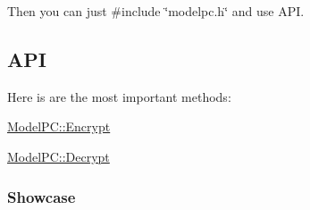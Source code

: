 Then you can just {\ttfamily \#include \char`\"{}modelpc.\+h\char`\"{}} and use A\+PI.\hypertarget{index_use_api}{}\subsection{A\+PI}\label{index_use_api}
Here is are the most important methods\+: 
\begin{DoxyItemize}
\item \hyperlink{class_model_p_c_a271cf9285e32df58ffbfc918e6482bbd}{Model\+P\+C\+::\+Encrypt} 
\item \hyperlink{class_model_p_c_a902abaea4f07995b48c0f2fea6eceb7c}{Model\+P\+C\+::\+Decrypt} 
\end{DoxyItemize}\hypertarget{index_Showcase}{}\subsubsection{Showcase}\label{index_Showcase}


